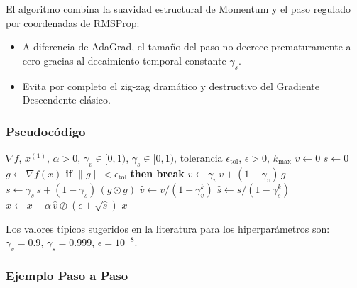 El algoritmo combina la suavidad estructural de Momentum y el paso regulado por coordenadas de RMSProp:
\begin{itemize}
    \item A diferencia de AdaGrad, el tamaño del paso no decrece prematuramente a cero gracias al decaimiento temporal constante $\gamma_s$.
    \item Evita por completo el zig-zag dramático y destructivo del Gradiente Descendente clásico.
\end{itemize}

\vspace{1em}
\subsubsection*{Pseudocódigo}

\begin{algorithmic}[1]
    \Require $\nabla f$, $x^{(1)}$, $\alpha > 0$, $\gamma_v \in [0,1)$, $\gamma_s \in [0,1)$, tolerancia $\epsilon_{\text{tol}}$, $\epsilon > 0$, $k_{\max}$
    \State $v \gets 0$
    \State $s \gets 0$
        \State $g \gets \nabla f(x)$
        \State \textbf{if} $\lVert g \rVert < \epsilon_{\text{tol}}$ \textbf{then break}
        \State $v \gets \gamma_v\, v + (1 - \gamma_v)\, g$ 
        \State $s \gets \gamma_s\, s + (1 - \gamma_s)\,(g \odot g)$ 
        \State $\hat{v} \gets v / (1 - \gamma_v^k)$ 
        \State $\hat{s} \gets s / (1 - \gamma_s^k)$ 
        \State $x \gets x - \alpha\,\hat{v} \oslash (\epsilon + \sqrt{\hat{s}})$ 
    \EndFor
    \State \Return $x$
\end{algorithmic}

\vspace{1em}
Los valores típicos sugeridos en la literatura para los hiperparámetros son: $\gamma_v=0.9$, $\gamma_s=0.999$, $\epsilon=10^{-8}$.

\vspace{1em}
\subsubsection*{Ejemplo Paso a Paso}

